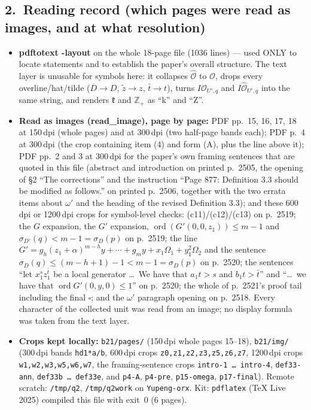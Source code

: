 \documentclass[11pt]{article}
\newcommand{\fk}{\mathfrak{k}}                 %
\newcommand{\OO}{\mathcal{O}}                  %
\newcommand{\OH}{\widehat{\mathcal{O}}}        %
\newcommand{\Dbar}{\overline{D}}               %
\newcommand{\ztil}{\widetilde{z}}              %
\newcommand{\tbar}{\bar{t}}                    %
\newcommand{\ord}{\operatorname{ord}}
\begin{document}
\subsection*{2.\ Reading record (which pages were read as images, and at what resolution)}
\begin{itemize}\itemsep0.2em
\item \textbf{pdftotext -layout} on the whole 18-page file (1036 lines) --- used ONLY to
      locate statements and to establish the paper's overall structure. The text layer is
      unusable for symbols here: it collapses $\OH$ to $\OO$, drops every overline/hat/tilde
      ($\Dbar \to D$, $\ztil \to z$, $\tbar \to t$), turns $I\OO_{U',q}$ and
      $I\OH_{U',q}$ into the same string, and renders $\fk$ and $\mathbb{Z}_+$ as ``k''
      and ``Z''.
\item \textbf{Read as images (read\_image), page by page:} PDF pp.\ 15, 16, 17, 18 at
      150\,dpi (whole pages) and at 300\,dpi (two half-page bands each); PDF p.\ 4 at
      300\,dpi (the crop containing item (4) and form (A), plus the line above it); PDF
      pp.\ 2 and 3 at 300\,dpi for the paper's own framing sentences that are quoted in
      this file (abstract and introduction on printed p.\ 2505, the opening of
      \S2 ``The corrections'' and the instruction ``Page 877: Definition 3.3 should be
      modified as follows.'' on printed p.\ 2506, together with the two errata items
      about $\omega'$ and the heading of the revised Definition 3.3); and
      these 600\,dpi or 1200\,dpi crops for symbol-level checks:
      (c11)/(c12)/(c13) on p.\ 2519; the $G$ expansion, the $G'$ expansion,
      $\ord(G'(0,0,z_1)) \leqslant m-1$ and $\sigma_{D'}(q) < m-1 = \sigma_D(p)$ on
      p.\ 2519; the line $G' = g_h(z_1+\alpha)^{m-h}y + \cdots + g_m y + x_1\Omega_1 +
      y_1^2\Omega_2$ and the sentence $\sigma_D(q) \leqslant (m-h+1)-1 < m-1 = \sigma_D(p)$
      on p.\ 2520; the sentences ``let $x_1^s z_1^{\tbar}$ be a local generator \dots\ We
      have that $a_1 t > s$ and $b_1 t > \tbar$'' and ``\dots\ we have that
      $\ord G'(0,y,0) \leqslant 1$'' on p.\ 2520; the whole of p.\ 2521's proof tail
      including the final $\square$; and the $\omega'$ paragraph opening on p.\ 2518.
      Every character of the collected unit was read from an image; no display formula was
      taken from the text layer.
\item \textbf{Crops kept locally:} \texttt{b21/pages/} (150\,dpi whole pages 15--18),
      \texttt{b21/img/} (300\,dpi bands \texttt{hd1*a/b}, 600\,dpi crops
      \texttt{z0,z1,z2,z3,z5,z6,z7}, 1200\,dpi crops \texttt{w1,w2,w3,w5,w6,w7}, the
      framing-sentence crops \texttt{intro-1\,\dots\,intro-4}, \texttt{def33-ann},
      \texttt{def33b\,\dots\,def33e}, and \texttt{p4-A}, \texttt{p4-pre},
      \texttt{p15-omega}, \texttt{p17-final}).
      Remote scratch: \texttt{/tmp/q2}, \texttt{/tmp/q2work} on \texttt{Yupeng-orx}.
      Kit: \texttt{pdflatex} (TeX Live 2025) compiled this file with exit~0 (6 pages).
\end{itemize}
\end{document}

